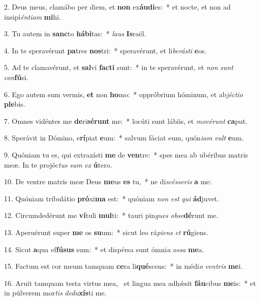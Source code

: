 2. Deus meus, clamábo per diem, et \textbf{non} ex\textbf{áu}\textbf{di}es:~*  et nocte, et non ad insipi\textit{én}\textit{ti}\textit{am} \textbf{mi}hi.\

3. Tu autem in \textbf{sanc}to \textbf{há}\textbf{bi}tas:~*  \textit{laus} \textbf{Is}raël.\

4. In te speravérunt \textbf{pa}tres \textbf{nos}tri:~*  speravérunt, et li\textit{be}\textit{rás}\textit{ti} \textbf{e}os.\

5. Ad te clamavérunt, et \textbf{sal}vi \textbf{fac}\textbf{ti} sunt:~*  in te speravérunt, et \textit{non} \textit{sunt} \textit{con}\textbf{fú}si.\

6. Ego autem sum vermis, \textbf{et} non \textbf{ho}mo:~*  oppróbrium hóminum, et ab\textit{jéc}\textit{ti}\textit{o} \textbf{ple}bis.\

7. Omnes vidéntes me \textbf{de}ri\textbf{sé}\textbf{runt} me:~*  locúti sunt lábiis, et \textit{mo}\textit{vé}\textit{runt} \textbf{ca}put.\

8. Sperávit in Dómino, e\textbf{rí}piat \textbf{e}um:~*  salvum fáciat eum, quón\textit{i}\textit{am} \textit{vult} \textbf{e}um.\

9. Quóniam tu es, qui extraxísti \textbf{me} de \textbf{ven}tre:~*  spes mea ab ubéribus matris meæ. In te projéc\textit{tus} \textit{sum} \textit{ex} \textbf{ú}tero.\

10. De ventre matris meæ Deus \textbf{me}us \textbf{es} tu,~*  ne di\textit{scés}\textit{se}\textit{ris} \textbf{a} me:\

11. Quóniam tribulátio \textbf{pró}xi\textbf{ma} est:~*  quóniam \textit{non} \textit{est} \textit{qui} \textbf{ád}juvet.\

12. Circumdedérunt me \textbf{ví}tuli \textbf{mul}ti:~*  tauri pin\textit{gues} \textit{ob}\textit{se}\textbf{dé}runt me.\

13. Aperuérunt super \textbf{me} os \textbf{su}um:~*  sicut leo rá\textit{pi}\textit{ens} \textit{et} \textbf{rú}giens.\

14. Sicut \textbf{a}qua ef\textbf{fú}\textbf{sus} sum:~*  et dispérsa sunt ómni\textit{a} \textit{os}\textit{sa} \textbf{me}a.\

15. Factum est cor meum tamquam \textbf{ce}ra li\textbf{qué}scens:~*  in médi\textit{o} \textit{ven}\textit{tris} \textbf{me}i.\

16. Aruit tamquam testa virtus mea, \dag\  et lingua mea adhǽsit \textbf{fáu}cibus \textbf{me}is:~*  et in púlverem mor\textit{tis} \textit{de}\textit{du}\textbf{xís}ti me.\

